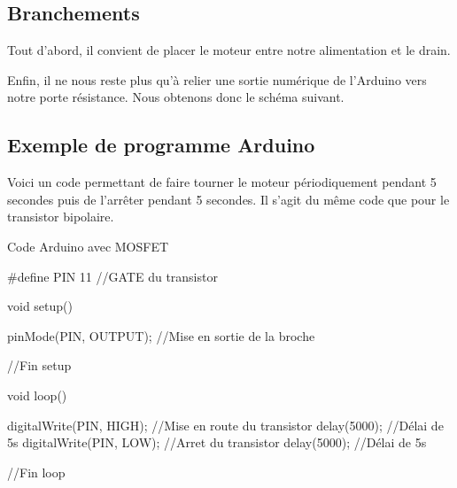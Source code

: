      \subsection{Branchements}

     Tout d'abord, il convient de placer le moteur entre notre alimentation et le drain.\\
     
 
 
     Enfin, il ne nous reste plus qu'à relier une sortie numérique de l'Arduino vers notre porte  résistance. Nous obtenons donc le schéma suivant.
 
  
     \subsection{Exemple de programme Arduino}
 
     Voici un code permettant de faire tourner le moteur périodiquement pendant 5 secondes puis de l'arrêter pendant 5 secondes. 
     Il s'agit du même code que pour le transistor bipolaire.
 
 \begin{Cpp}{Code Arduino avec MOSFET}

  #define PIN 11     //GATE du transistor
 
  void setup() {
  
    pinMode(PIN, OUTPUT); //Mise en sortie de la broche
  
  }//Fin setup
  
  void loop() {
  
    digitalWrite(PIN, HIGH);    //Mise en route du transistor
    delay(5000);               //Délai de 5s
    digitalWrite(PIN, LOW);     //Arret du transistor
    delay(5000);               //Délai de 5s
  
  }//Fin loop
  
 \end{Cpp}
